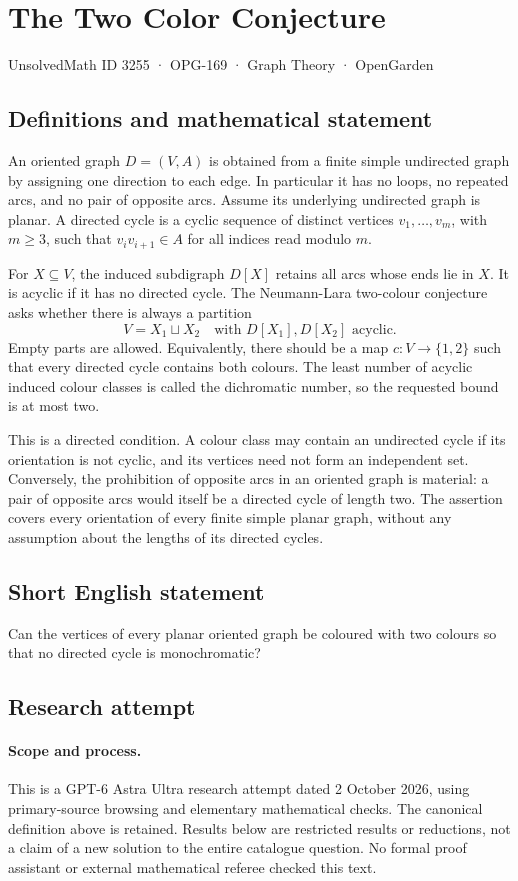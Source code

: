 \documentclass[11pt,a4paper]{article}
\begin{document}
\section*{The Two Color Conjecture}\label{3255}
{\small UnsolvedMath ID 3255 · OPG-169 · Graph Theory · OpenGarden}
\subsection{Definitions and mathematical statement}
An oriented graph $D=(V,A)$ is obtained from a finite simple undirected
graph by assigning one direction to each edge. In particular it has no
loops, no repeated arcs, and no pair of opposite arcs. Assume its
underlying undirected graph is planar. A directed cycle is a cyclic
sequence of distinct vertices $v_1,\ldots,v_m$, with $m\ge3$, such that
$v_i v_{i+1}\in A$ for all indices read modulo $m$.

For $X\subseteq V$, the induced subdigraph $D[X]$ retains all arcs whose
ends lie in $X$. It is acyclic if it has no directed cycle. The
Neumann-Lara two-colour conjecture asks whether there is always a
partition
\[
                  V=X_1\sqcup X_2
                  \quad\text{with }D[X_1],D[X_2]\text{ acyclic}.
\]
Empty parts are allowed. Equivalently, there should be a map
$c:V\to\{1,2\}$ such that every directed cycle contains both colours.
The least number of acyclic induced colour classes is called the
dichromatic number, so the requested bound is at most two.

This is a directed condition. A colour class may contain an undirected
cycle if its orientation is not cyclic, and its vertices need not form
an independent set. Conversely, the prohibition of opposite arcs in an
oriented graph is material: a pair of opposite arcs would itself be a
directed cycle of length two. The assertion covers every orientation of
every finite simple planar graph, without any assumption about the
lengths of its directed cycles.
\subsection{Short English statement}
Can the vertices of every planar oriented graph be coloured with two colours so that no directed cycle is monochromatic?
\subsection{Research attempt}
\paragraph{Scope and process.}
This is a GPT-6 Astra Ultra research attempt dated 2 October 2026, using
primary-source browsing and elementary mathematical checks. The canonical
definition above is retained. Results below are restricted results or
reductions, not a claim of a new solution to the entire catalogue question.
No formal proof assistant or external mathematical referee checked this text.
\end{document}
